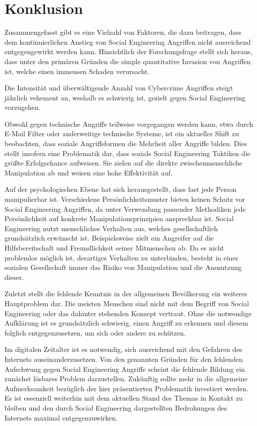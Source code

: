 \chapter{Konklusion}
\label{chapter:konklusion}

Zusammengefasst gibt es eine Vielzahl von Faktoren, die dazu beitragen, dass dem kontinuierlichen Anstieg von Social Engineering Angriffen nicht ausreichend entgegengewirkt werden kann.
Hinsichtlich der Forschungsfrage stellt sich heraus, dass unter den primären Gründen die simple quantitative Invasion von Angriffen ist, welche einen immensen Schaden verursacht.

Die Intensität und überwältigende Anzahl von Cybercrime Angriffen steigt jährlich vehement an, weshalb es schwierig ist, gezielt gegen Social Engineering vorzugehen.

Obwohl gegen technische Angriffe teilweise vorgegangen werden kann, etwa durch E-Mail Filter oder anderweitige technische Systeme, ist ein aktueller Shift zu beobachten,
dass soziale Angriffsformen die Mehrheit aller Angriffe bilden. Dies stellt insofern eine Problematik dar, dass soziale Social Engineering Taktiken die größte Erfolgschance aufweisen.
Sie zielen auf die direkte zwischenmenschliche Manipulation ab und weisen eine hohe Effektivität auf.

Auf der psychologischen Ebene hat sich herausgestellt, dass fast jede Person manipulierbar ist. Verschiedene Persönlichkeitsmuster bieten keinen Schutz vor Social Engineering Angriffen, da unter Verwendung
passender Methodiken jede Persönlichkeit auf konkrete Manipulationsprinzipien ansprechbar ist.
Social Engineering nutzt menschliches Verhalten aus, welches gesellschaftlich grundsätzlich erwünscht ist.
Beispielsweise zielt ein Angreifer auf die Hilfsbereitschaft und Freundlichkeit seiner Mitmenschen ab.
Da es nicht problemlos möglich ist, derartiges Verhalten zu unterbinden, besteht in einer sozialen Gesellschaft immer das Risiko von Manipulation und die Ausnutzung dieser.

Zuletzt stellt die fehlende Kenntnis in der allgemeinen Bevölkerung ein weiteres Hauptproblem dar.
Die meisten Menschen sind nicht mit dem Begriff von Social Engineering oder das dahinter stehenden Konzept vertraut.
Ohne die notwendige Aufklärung ist es grundsätzlich schwierig, einen Angriff zu erkennen und diesem folglich entgegenzusetzen, um sich oder andere zu schützen.

Im digitalen Zeitalter ist es notwendig, sich ausreichend mit den Gefahren des Internets auseinanderzusetzen.
Von den genannten Gründen für den fehlenden Aufschwung gegen Social Engineering Angriffe scheint die fehlende Bildung ein zunächst lösbares Problem darzustellen.
Zukünftig sollte mehr in die allgemeine Aufmerksamkeit bezüglich der hier präsentierten Problematik investiert werden.
Es ist essenziell weiterhin mit dem aktuellen Stand des Themas in Kontakt zu bleiben und den durch Social Engineering dargestellten Bedrohungen des Internets maximal entgegenzuwirken.

